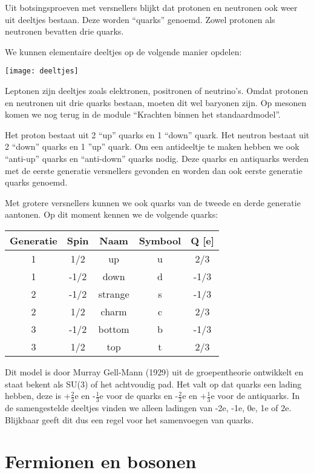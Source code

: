 Uit botsingsproeven met versnellers blijkt dat protonen en neutronen
ook weer uit deeltjes bestaan. Deze worden ``quarks'' genoemd. Zowel
protonen als neutronen bevatten drie quarks.

We kunnen elementaire deeltjes op de volgende manier opdelen:

\noindent \begin{center}
\texttt{[image: deeltjes]}
\par\end{center}

Leptonen zijn deeltjes zoals elektronen, positronen of neutrino's.
Omdat protonen en neutronen uit drie quarks bestaan, moeten dit wel
baryonen zijn. Op mesonen komen we nog terug in de module ``Krachten
binnen het standaardmodel''. 

Het proton bestaat uit 2 ``up'' quarks en 1 ``down'' quark. Het
neutron bestaat uit 2 ``down'' quarks en 1 ''up'' quark. Om een
antideeltje te maken hebben we ook ``anti-up'' quarks en ``anti-down''
quarks nodig. Deze quarks en antiquarks werden met de eerste generatie
versnellers gevonden en worden dan ook eerste generatie quarks genoemd.

Met grotere versnellers kunnen we ook quarks van de tweede en derde
generatie aantonen. Op dit moment kennen we de volgende quarks:

\noindent \begin{center}
\begin{tabular}{|c|c|c|c|c|}
\hline 
Generatie & Spin & Naam & Symbool & Q {[}e{]}\tabularnewline
\hline 
\hline 
1 & 1/2 & up & u & 2/3\tabularnewline
\hline 
1 & -1/2 & down & d & -1/3\tabularnewline
\hline 
2 & -1/2 & strange & s & -1/3\tabularnewline
\hline 
2 & 1/2 & charm & c & 2/3\tabularnewline
\hline 
3 & -1/2 & bottom & b & -1/3\tabularnewline
\hline 
3 & 1/2 & top & t & 2/3\tabularnewline
\hline 
\end{tabular}
\par\end{center}

Dit model is door Murray Gell-Mann (1929) uit de groepentheorie ontwikkelt
en staat bekent als SU(3) of het achtvoudig pad. Het valt op dat quarks
een lading hebben, deze is +$\frac{2}{3}$e en -$\frac{1}{3}$e voor
de quarks en -$\frac{2}{3}$e en +$\frac{1}{3}$e voor de antiquarks.
In de samengestelde deeltjes vinden we alleen ladingen van -2e, -1e,
0e, 1e of 2e. Blijkbaar geeft dit dus een regel voor het samenvoegen
van quarks.


\section{Fermionen en bosonen}

